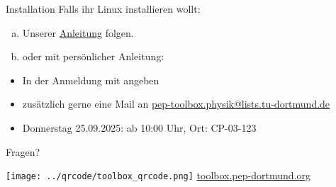 \begin{frame}{Installation}
  \huge
  Falls ihr Linux installieren wollt:\\[0.5\baselineskip]
	\begin{enumerate}[a)]
    \item Unserer \href{https://toolbox.pep-dortmund.org/install/dualboot/}{Anleitung} folgen.
    \item oder mit persönlicher Anleitung:
  \end{enumerate}
  \begin{itemize}
    \item In der Anmeldung mit angeben
    \item zusätzlich gerne eine Mail an \href{mailto:pep-toolbox.physik@lists.tu-dortmund.de}{pep-toolbox.physik@lists.tu-dortmund.de}
    \item Donnerstag 25.09.2025: ab 10:00 Uhr, Ort: CP-03-123
  \end{itemize}
\end{frame}
\begin{frame}
  \begin{minipage}{.5\textwidth}
    \Huge\centering
    \textcolor{red!70!black}{Fragen?}
  \end{minipage}
  \begin{minipage}{.49\textwidth}
    \centering
    \texttt{[image: ../qrcode/toolbox\_qrcode.png]}
    \Large
    \url{toolbox.pep-dortmund.org}
  \end{minipage}
\end{frame}

